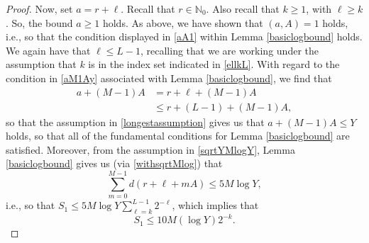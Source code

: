 \documentclass[12pt]{article}
\begin{document}
\begin{proof}
 Now, set $a = r + \ell$. Recall that $r \in \mathbb{N}_{0}$. Also recall that $k \geq 1$, with $\ell \geq k$. So, the bound $a \geq 1$ 
 holds. As above, we have shown that $(a, A) = 1$ holds, i.e., so that the condition displayed in \eqref{aA1} within Lemma 
 \ref{basiclogbound} holds. We again have that $\ell \leq L-1$, recalling that we are working under the assumption that $k$ is in the 
 index set indicated in \eqref{ellkL}. With regard to the condition in \eqref{aM1Ay} associated with Lemma \ref{basiclogbound}, 
 we find that 
\begin{align*}
 a + (M-1) A & = r + \ell + (M-1) A \\ 
 & \leq r + (L-1) + (M-1) A, 
\end{align*}
 so that the assumption in \eqref{longestassumption} gives us that $a + (M - 1) A \leq Y$ holds, so that all of the fundamental 
 conditions for Lemma \ref{basiclogbound} are satisfied. Moreover, from the assumption in \eqref{sqrtYMlogY}, Lemma \ref{basiclogbound} 
 gives us (via \eqref{withsqrtMlog}) that $$ \sum_{m=0}^{M-1} d(r + \ell + m A) \leq 5 M \log Y, $$ i.e., so that $ S_{1} \leq 5 M \log Y 
 \sum_{\ell = k}^{L-1} 2^{-\ell}$, which implies that 
\begin{equation}\label{S1final} 
 S_{1} \leq 10 M (\log Y) 2^{-k}. 
\end{equation}


\end{proof}
\end{document}
